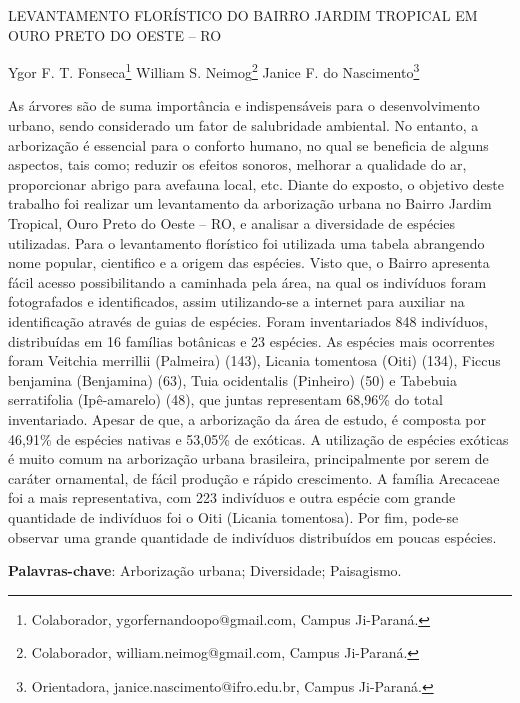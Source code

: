 \documentclass[article,12pt,onesidea,4paper,english,brazil]{abntex2}
\begin{document}
	
	
	\frenchspacing 
	
	\begin{center}
		\LARGE LEVANTAMENTO FLORÍSTICO DO BAIRRO JARDIM TROPICAL EM OURO PRETO DO OESTE – RO
		
		\normalsize
		Ygor F. T. Fonseca\footnote{Colaborador, ygorfernandoopo@gmail.com, Campus Ji-Paraná.} 
		William S. Neimog\footnote{Colaborador, william.neimog@gmail.com, Campus Ji-Paraná.} 
		Janice F. do Nascimento\footnote{Orientadora, janice.nascimento@ifro.edu.br, Campus Ji-Paraná.} 
		 
	\end{center}
	
	\noindent As árvores são de suma importância e indispensáveis para o desenvolvimento
	urbano, sendo considerado um fator de salubridade ambiental. No entanto, a
	arborização é essencial para o conforto humano, no qual se beneficia de alguns
	aspectos, tais como; reduzir os efeitos sonoros, melhorar a qualidade do ar,
	proporcionar abrigo para avefauna local, etc. Diante do exposto, o objetivo deste
	trabalho foi realizar um levantamento da arborização urbana no Bairro Jardim
	Tropical, Ouro Preto do Oeste – RO, e analisar a diversidade de espécies utilizadas.
	Para o levantamento florístico foi utilizada uma tabela abrangendo nome popular,
	cientifico e a origem das espécies. Visto que, o Bairro apresenta fácil acesso
	possibilitando a caminhada pela área, na qual os indivíduos foram fotografados e
	identificados, assim utilizando-se a internet para auxiliar na identificação através de
	guias de espécies. Foram inventariados 848 indivíduos, distribuídas em 16 famílias
	botânicas e 23 espécies. As espécies mais ocorrentes foram Veitchia merrillii
	(Palmeira) (143), Licania tomentosa (Oiti) (134), Ficcus benjamina (Benjamina) (63),
	Tuia ocidentalis (Pinheiro) (50) e Tabebuia serratifolia (Ipê-amarelo) (48), que juntas
	representam 68,96\% do total inventariado. Apesar de que, a arborização da área de
	estudo, é composta por 46,91\% de espécies nativas e 53,05\% de exóticas. A
	utilização de espécies exóticas é muito comum na arborização urbana brasileira,
	principalmente por serem de caráter ornamental, de fácil produção e rápido
	crescimento. A família Arecaceae foi a mais representativa, com 223 indivíduos e
	outra espécie com grande quantidade de indivíduos foi o Oiti (Licania tomentosa).
	Por fim, pode-se observar uma grande quantidade de indivíduos distribuídos em
	poucas espécies.
	
	\vspace{\onelineskip}
	
	\noindent
	\textbf{Palavras-chave}: Arborização urbana; Diversidade; Paisagismo.
	
\end{document}

